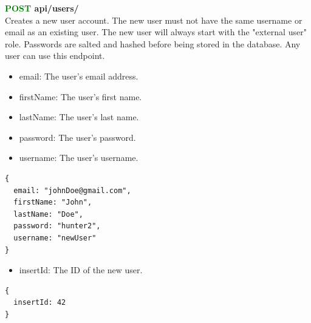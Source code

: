 \documentclass[onecolumn, draftclsnofoot,10pt, compsoc, usenames, dvipsnames]{IEEEtran}
\begin{document}
\noindent
\textbf{\textcolor{Green}{POST} api/users/} \\
Creates a new user account. The new user must not have the same username or email as an existing user. The new user will always start with the "external user" role. Passwords are salted and hashed before being stored in the database. Any user can use this endpoint.
\begin{itemize}
    \item email: The user's email address.
    \item firstName: The user's first name.
    \item lastName: The user's last name.
    \item password: The user's password.
    \item username: The user's username.
\end{itemize}
\begin{lstlisting}[caption=Example Request Body]
{
  email: "johnDoe@gmail.com",
  firstName: "John",
  lastName: "Doe",
  password: "hunter2",
  username: "newUser"
}
\end{lstlisting}
\begin{itemize}
    \item insertId: The ID of the new user.
\end{itemize}
\begin{lstlisting}[caption=Example Response]
{ 
  insertId: 42
}
\end{lstlisting}
\\~\\
\end{document}
